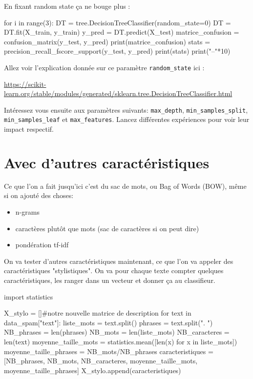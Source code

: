  En fixant random state ça ne bouge plus : 

\begin{python}
for i in range(3):
  DT = tree.DecisionTreeClassifier(random_state=0)
  DT = DT.fit(X_train, y_train)
  y_pred = DT.predict(X_test)
  matrice_confusion = confusion_matrix(y_test, y_pred)
  print(matrice_confusion)
  stats = precision_recall_fscore_support(y_test, y_pred)
  print(stats)
  print("--"*10)
\end{python}

Allez voir l'explication donnée sur ce paramètre \texttt{random\_state} ici :

\small{\url{https://scikit-learn.org/stable/modules/generated/sklearn.tree.DecisionTreeClassifier.html}}

Intéressez vous ensuite aux paramètres suivants: \texttt{max\_depth}, \texttt{min\_samples\_split}, \texttt{min\_samples\_leaf} et \texttt{max\_features}.
Lancez différentes expériences pour voir leur impact respectif.

\section{Avec d'autres caractéristiques}

Ce que l'on a fait jusqu'ici c'est du sac de mots, ou Bag of Words (BOW), même si on ajouté des choses:

\begin{itemize}
  \item n-grams
  \item caractères plutôt que mots (sac de caractères si on peut dire)
  \item pondération tf-idf
\end{itemize}

On va tester d'autres caractéristiques maintenant, ce que l'on va appeler des caractéristiques "stylistiques". On va pour chaque texte compter quelques caractéristiques, les ranger dans un vecteur et donner ça au classifieur.

\begin{python}
import statistics

X_stylo = []#notre nouvelle matrice de description
for text in data_spam["text"]:
    liste_mots = text.split()
    phrases = text.split(". ")
    NB_phrases = len(phrases)
    NB_mots = len(liste_mots)
    NB_caracteres = len(text)
    moyenne_taille_mots = statistics.mean([len(x) for x in liste_mots])
    moyenne_taille_phrases = NB_mots/NB_phrases
    caracteristiques = [NB_phrases, NB_mots, NB_caracteres, moyenne_taille_mots, moyenne_taille_phrases]
    X_stylo.append(caracteristiques)
\end{python}

